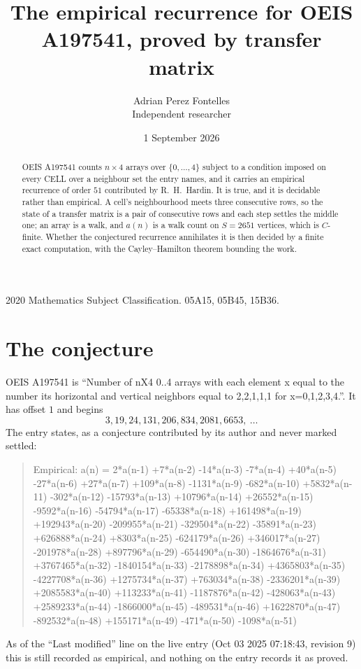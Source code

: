 \documentclass[11pt,a4paper]{article}
\title{The empirical recurrence for OEIS A197541, proved by transfer matrix}
\author{Adrian Perez Fontelles\\ \small Independent researcher}
\date{1 September 2026}
\theoremstyle{plain}
\theoremstyle{definition}
\begin{document}
\maketitle

\begin{abstract}
OEIS A197541 counts $n\times4$ arrays over $\{0,\dots,4\}$ subject to a condition imposed on
every CELL over a neighbour set the entry names, and it carries an empirical recurrence of
order $51$ contributed by R.~H.~Hardin. It is true, and it is decidable rather than
empirical. A cell's neighbourhood meets three consecutive rows, so the state of a transfer
matrix is a pair of consecutive rows and each step settles the middle one; an array is a
walk, and $a(n)$ is a walk count on $S=2651$ vertices, which is $C$-finite. Whether the
conjectured recurrence annihilates it is then decided by a finite exact computation, with the
Cayley--Hamilton theorem bounding the work.
\end{abstract}

\noindent\small 2020 Mathematics Subject Classification. 05A15, 05B45, 15B36.\normalsize

\section{The conjecture}

OEIS A197541 is ``Number of nX4 0..4 arrays with each element x equal to the number its horizontal and vertical neighbors equal to 2,2,1,1,1 for x=0,1,2,3,4.''. It has offset $1$ and begins
\[
3, 19, 24, 131, 206, 834, 2081, 6653,\ \dots
\]
The entry states, as a conjecture contributed by its author and never marked settled:
\begin{quote}
Empirical: a(n) = 2*a(n-1) +7*a(n-2) -14*a(n-3) -7*a(n-4) +40*a(n-5) -27*a(n-6) +27*a(n-7) +109*a(n-8) -1131*a(n-9) -682*a(n-10) +5832*a(n-11) -302*a(n-12) -15793*a(n-13) +10796*a(n-14) +26552*a(n-15) -9592*a(n-16) -54794*a(n-17) -65338*a(n-18) +161498*a(n-19) +192943*a(n-20) -209955*a(n-21) -329504*a(n-22) -35891*a(n-23) +626888*a(n-24) +8303*a(n-25) -624179*a(n-26) +346017*a(n-27) -201978*a(n-28) +897796*a(n-29) -654490*a(n-30) -1864676*a(n-31) +3767465*a(n-32) -1840154*a(n-33) -2178898*a(n-34) +4365803*a(n-35) -4227708*a(n-36) +1275734*a(n-37) +763034*a(n-38) -2336201*a(n-39) +2085583*a(n-40) +113233*a(n-41) -1187876*a(n-42) -428063*a(n-43) +2589233*a(n-44) -1866000*a(n-45) -489531*a(n-46) +1622870*a(n-47) -892532*a(n-48) +155171*a(n-49) -471*a(n-50) -1098*a(n-51)
\end{quote}
As of the ``Last modified'' line on the live entry (Oct 03 2025 07:18:43, revision 9) this is still
recorded as empirical, and nothing on the entry records it as proved.
\end{document}
